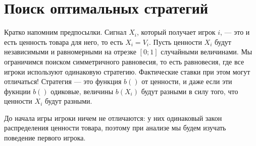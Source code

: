 \section{Поиск оптимальных стратегий}

Кратко напомним предпосылки. Сигнал $ X_{i} $, который получает игрок $i$, — это и есть ценность товара для него, то есть $ X_{i}=V_{i} $. Пусть ценности $ X_{i} $ будут независимыми и равномерными на отрезке $ [0;1] $ случайными величинами. Мы ограничимся поиском симметричного равновесия, то есть равновесия, где все игроки используют одинаковую стратегию. Фактические ставки при этом могут отличаться! Стратегия — это функция $b()$ от ценности, и даже если эти фукнции $ b() $ одиковые, величины $ b(X_{i}) $ будут разными в силу того, что ценности $ X_{i} $ будут разными.


До начала игры игроки ничем не отличаются: у них одинаковый закон распределения ценности товара, поэтому при анализе мы будем изучать поведение первого игрока.

